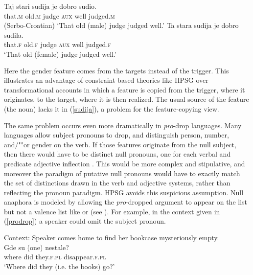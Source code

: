 \documentclass[output=paper,biblatex,babelshorthands,newtxmath,draftmode,colorlinks,citecolor=brown]{langscibook}
\begin{document}
\begin{exe}
\ex \label{sudija}
\begin{xlist}
\ex
\gll Taj	stari	sudija	je	dobro	sudio.	 \\
     that.\textsc{m}	old.\textsc{m}	judge	\textsc{aux}	well	judged.\textsc{m} \\\hfill(Serbo-Croatian)
\glt `That old (male) judge judged well.'
\ex 
\label{ex-ta-stara-studija}
 \gll Ta	      stara	     sudija	je	dobro	sudila. \\
      that.\textsc{f} old.\textsc{f} judge	\textsc{aux}	well	judged.\textsc{f}\\
	\glt `That old (female) judge  judged well.’
\end{xlist}
\end{exe}

\noindent 
Here the gender feature comes from the targets instead of the trigger.   This illustrates an advantage of constraint-based theories like HPSG over transformational accounts in which a feature is copied from the trigger, where it originates, to the target, where it is then realized.  The usual source of the feature (the noun) lacks it in (\ref{sudija}), a problem for the feature-copying view.

The same problem occurs even more dramatically in \emph{pro}-drop languages.  Many languages
allow subject pronouns to drop, and distinguish person, number, and/""or gender on the verb.  If those
features originate from the null subject, then there would have to be distinct null pronouns, one
for each verbal and predicate adjective inflection \citep[64]{Pollard+Sag:1994}.  This would be more
complex and stipulative, and moreover the paradigm of putative null pronouns would have to exactly
match the set of distinctions drawn in the verb and adjective systems, rather than reflecting the
pronoun paradigm. HPSG avoids this suspicious assumption.  Null anaphora is modeled by allowing
the \textit{pro}-dropped argument to appear on the \argst list but not a valence list like \subj or \comps (see ).  For example, in the context given in (\ref{prodrop}) a  speaker could omit the subject pronoun.  

\begin{exe}
\ex 
\label{prodrop}
Context: Speaker comes home to find her bookcase mysteriously empty. \\
\gll Gde   su  (one)                           nestale? \\
     where did \hphantom{(}they.\textsc{f.pl} disappear.\textsc{f.pl}     \\
\glt `Where did they (i.e. the books) go?' 
\end{exe}
\end{document}
